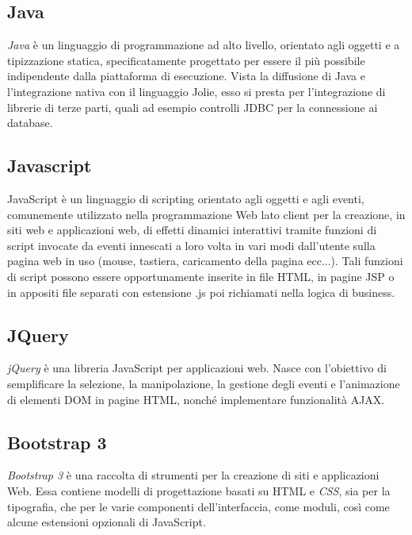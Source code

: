 \subsection{Java}
 \textit{Java} è un linguaggio di programmazione ad alto livello, orientato agli oggetti e a tipizzazione statica, specificatamente progettato per essere il più possibile indipendente dalla piattaforma di esecuzione. Vista la diffusione di Java e l'integrazione nativa con il linguaggio Jolie, esso si presta per l'integrazione di librerie di terze parti, quali ad esempio controlli JDBC per la connessione ai database. 
 
\subsection{Javascript}
JavaScript è un linguaggio di scripting orientato agli oggetti e agli eventi, comunemente utilizzato nella programmazione Web lato client per la creazione, in siti web e applicazioni web, di effetti dinamici interattivi tramite funzioni di script invocate da eventi innescati a loro volta in vari modi dall'utente sulla pagina web in uso (mouse, tastiera, caricamento della pagina ecc...). Tali funzioni di script possono essere opportunamente inserite in file HTML, in pagine JSP o in appositi file separati con estensione .js poi richiamati nella logica di business.

\subsection{JQuery}
\textit{jQuery} è una libreria JavaScript per applicazioni web. Nasce con l'obiettivo di semplificare la selezione, la manipolazione, la gestione degli eventi e l'animazione di elementi DOM in pagine HTML, nonché implementare funzionalità AJAX. 

\subsection{Bootstrap 3}
\textit{Bootstrap 3} è una raccolta di strumenti per la creazione di siti e applicazioni Web. Essa contiene modelli di progettazione basati su HTML e \textit{CSS}, sia per la tipografia, che per le varie componenti dell’interfaccia, come moduli, così come alcune estensioni opzionali di JavaScript.